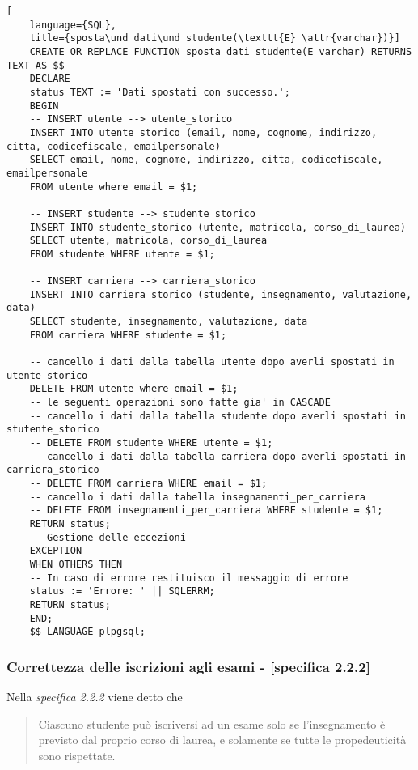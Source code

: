 \documentclass{article}
\newcommand{\attr}[1]{\texttt{\textcolor{gray}{#1}}}
\newcommand{\und}[0]{\textunderscore}
\begin{document}
    \pagebreak
    \begin{lstlisting}[
    language={SQL},
    title={sposta\und dati\und studente(\texttt{E} \attr{varchar})}]
    CREATE OR REPLACE FUNCTION sposta_dati_studente(E varchar) RETURNS TEXT AS $$
    DECLARE
    status TEXT := 'Dati spostati con successo.';
    BEGIN
    -- INSERT utente --> utente_storico
    INSERT INTO utente_storico (email, nome, cognome, indirizzo, citta, codicefiscale, emailpersonale)
    SELECT email, nome, cognome, indirizzo, citta, codicefiscale, emailpersonale
    FROM utente where email = $1;

    -- INSERT studente --> studente_storico
    INSERT INTO studente_storico (utente, matricola, corso_di_laurea)
    SELECT utente, matricola, corso_di_laurea
    FROM studente WHERE utente = $1;

    -- INSERT carriera --> carriera_storico
    INSERT INTO carriera_storico (studente, insegnamento, valutazione, data)
    SELECT studente, insegnamento, valutazione, data
    FROM carriera WHERE studente = $1;

    -- cancello i dati dalla tabella utente dopo averli spostati in utente_storico
    DELETE FROM utente where email = $1;
    -- le seguenti operazioni sono fatte gia' in CASCADE
    -- cancello i dati dalla tabella studente dopo averli spostati in stutente_storico
    -- DELETE FROM studente WHERE utente = $1;
    -- cancello i dati dalla tabella carriera dopo averli spostati in carriera_storico
    -- DELETE FROM carriera WHERE email = $1;
    -- cancello i dati dalla tabella insegnamenti_per_carriera
    -- DELETE FROM insegnamenti_per_carriera WHERE studente = $1;
    RETURN status;
    -- Gestione delle eccezioni
    EXCEPTION
    WHEN OTHERS THEN
    -- In caso di errore restituisco il messaggio di errore
    status := 'Errore: ' || SQLERRM;
    RETURN status;
    END;
    $$ LANGUAGE plpgsql;
\end{lstlisting}
\subsubsection{Correttezza delle iscrizioni agli esami - [specifica 2.2.2]}
Nella \textit{specifica 2.2.2} viene detto che
\begin{quote}
    Ciascuno studente può iscriversi ad un esame solo se l'insegnamento è previsto dal proprio corso di laurea, e solamente se tutte le propedeuticità sono rispettate.
\end{quote}
\end{document}
